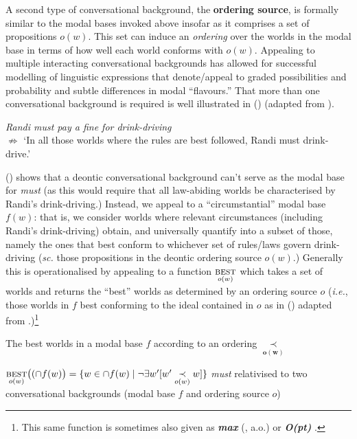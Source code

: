 \documentclass[12pt,dvipsnames]{report}
\begin{document}
\xe

A second type of conversational background, the \textbf{ordering source}, is formally similar to the modal bases invoked above insofar as it comprises a set of propositions $ o(w) $. This set can induce an \textit{ordering} over the worlds in the modal base in terms of how well each world conforms with $ o(w) $. Appealing to multiple interacting conversational backgrounds has allowed for successful modelling of linguistic expressions that denote/appeal to graded possibilities and probability and subtle differences in modal ``flavours.'' That more than one conversational background is required is well illustrated in (\nextx) (adapted from \citealp*{Kaufmann2006}).

\pex \textit{Randi must pay a fine for drink-driving}\\ $ \boldsymbol{\not\Rightarrow }$ `In all those worlds where the rules are best followed, Randi must drink-drive.'\xe

\noindent(\lastx) shows that a deontic conversational background can't serve as the modal base for \textit{must} (as this would require that all law-abiding worlds be characterised by Randi's drink-driving.) Instead, we appeal to a ``circumstantial'' modal base $ f(w) $: that is, we consider worlds where relevant circumstances (including Randi's drink-driving) obtain, and universally quantify into a subset of those, namely the ones that best conform to whichever set of rules/laws govern drink-driving (\textit{sc.} those propositions in the deontic ordering source $ o(w) $.) Generally this is operationalised by appealing to a function $ \underset{o(w)}{\textsc{best}}$ which takes a set of worlds and returns the ``best'' worlds as determined by an ordering source $ o $ (\textit{i.e.}, those worlds in $ f $ best conforming to the ideal contained in $ o $ as in (\nextx) adapted from \citealp[61]{VonFintel2011}.)\footnote{This same function is sometimes also given as \textbf{\textit{max}} (\citealp[e.g.][]{Hacquard2006,VonFintel2008,VonFintel2011}, a.o.) or \textbf{\textit{O(pt)}} \citep[247]{Schwager2006}.} 

\ex The best worlds in a modal base $ f $ according to an ordering $\boldsymbol{\underset{o(w)}{\prec}}$

$ \underset{o(w)}{\textsc{best}}\big((\cap f(w)\big)=\{w\in\cap f(w)\mid \neg\exists w'[w'\underset{o(w)}{\prec}w]\}$\label{ord-source}\xe
\pex \textit{must} relativised to two conversational backgrounds (modal base $ f $ and ordering source $ o $)
\end{document}
